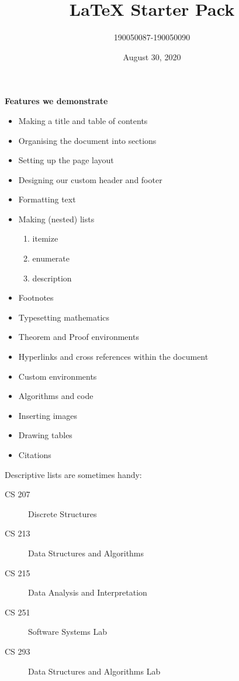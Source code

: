 \documentclass[12pt, letterpaper]{article}
\begin{document}
\title{LaTeX Starter Pack}
\author{190050087-190050090}
\date{August 30, 2020 }
\maketitle

\textbf{ Features we demonstrate}



\begin{itemize}
	\item Making a title and table of contents
	\item Organising the document into sections
	\item Setting up the page layout
	\item Designing our custom header and footer
	\item Formatting text
	\item Making (nested) lists
	\begin{enumerate}
		\item itemize
		\item enumerate
		\item description
	\end{enumerate}	
	\item Footnotes
	\item Typesetting mathematics
	\item Theorem and Proof environments
	\item Hyperlinks and cross references within the document 
	\item Custom environments
	\item Algorithms and code
	\item Inserting images
	\item Drawing tables
	\item Citations
\end{itemize}	



Descriptive lists are sometimes handy:


\begin{description}
	\item [CS 207] Discrete Structures
	\item [CS 213] Data Structures and Algorithms
	\item [CS 215] Data Analysis and Interpretation
	\item [CS 251] Software Systems Lab
	\item [CS 293] Data Structures and Algorithms Lab
\end{description}	
\end{document}
